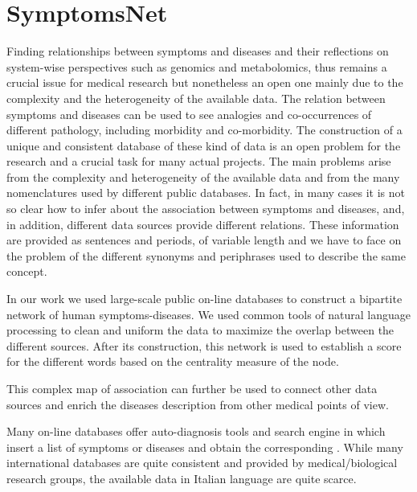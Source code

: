 \documentclass{standalone}
\begin{document}
\section[SymptomsNet]{SymptomsNet}\label{chimera:symptomsnet}

Finding relationships between symptoms and diseases and their reflections on system-wise perspectives such as genomics and metabolomics, thus remains a crucial issue for medical research but nonetheless an open one mainly due to the complexity and the heterogeneity of the available data.
The relation between symptoms and diseases can be used to see analogies and co-occurrences of different pathology, including morbidity and co-morbidity.
The construction of a unique and consistent database of these kind of data is an open problem for the research and a crucial task for many actual projects.
The main problems arise from the complexity and heterogeneity of the available data and from the many nomenclatures used by different public databases.
In fact, in many cases it is not so clear how to infer about the association between symptoms and diseases, and, in addition, different data sources provide different relations.
These information are provided as sentences and periods, of variable length and we have to face on the problem of the different synonyms and periphrases used to describe the same concept.

In our work we used large-scale public on-line databases to construct a bipartite network of human symptoms-diseases.
We used common tools of natural language processing to clean and uniform the data to maximize the overlap between the different sources.
After its construction, this network is used to establish a score for the different words based on the centrality measure of the node.

This complex map of association can further be used to connect other data sources and enrich the diseases description from other medical points of view.

Many on-line databases offer auto-diagnosis tools and search engine in which insert a list of symptoms or diseases and obtain the corresponding .
While many international databases are quite consistent and provided by medical/biological research groups, the available data in Italian language are quite scarce.
\end{document}
